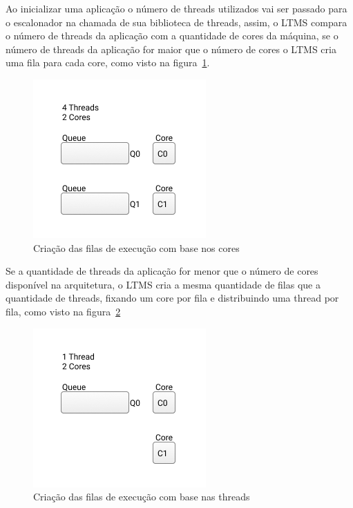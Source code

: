 \documentclass[diss,capa]{texufpel}
\begin{document}
Ao inicializar uma aplicação o número de threads utilizados vai ser passado para o escalonador na chamada de sua biblioteca de threads, assim, o LTMS compara o número de threads da aplicação com a quantidade de cores da máquina, se o número de threads da aplicação for maior que o número de cores o LTMS cria uma fila para cada core, como visto na figura~\ref{queue_core}.

\begin{figure}[htbp]
  \centering
  \includegraphics[scale=.8]{images/Queue_core.png}
  \caption{Criação das filas de execução com base nos cores}
\label{queue_core}
\end{figure}

Se a quantidade de threads da aplicação for menor que o número de cores disponível na arquitetura, o LTMS cria a mesma quantidade de filas que a quantidade de threads, fixando um core por fila e distribuindo uma thread por fila, como visto na figura~\ref{queue_thread}

\begin{figure}[htbp]
  \centering
  \includegraphics[scale=.8]{images/Queues_thread.png}
\caption{Criação das filas de execução com base nas threads} 
\label{queue_thread}
\end{figure}

\end{document}
